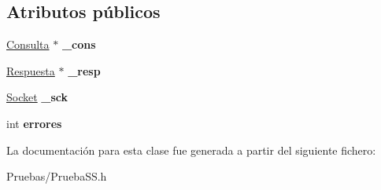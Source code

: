 \subsection*{\-Atributos públicos}
\begin{DoxyCompactItemize}
\item 
\hypertarget{classssEmisor_a0588e71dc02490593286eb5e2bfd414d}{\hyperlink{classConsulta}{\-Consulta} $\ast$ {\bfseries \-\_\-cons}}\label{classssEmisor_a0588e71dc02490593286eb5e2bfd414d}

\item 
\hypertarget{classssEmisor_abea16c87ff90df54136e8c45157f2194}{\hyperlink{classRespuesta}{\-Respuesta} $\ast$ {\bfseries \-\_\-resp}}\label{classssEmisor_abea16c87ff90df54136e8c45157f2194}

\item 
\hypertarget{classssEmisor_aeb3c41f96917e474ba6b655131f1ccf8}{\hyperlink{classSocket}{\-Socket} {\bfseries \-\_\-sck}}\label{classssEmisor_aeb3c41f96917e474ba6b655131f1ccf8}

\item 
\hypertarget{classssEmisor_a6f4bf514975f95fa450bee1ad2903c64}{int {\bfseries errores}}\label{classssEmisor_a6f4bf514975f95fa450bee1ad2903c64}

\end{DoxyCompactItemize}


\-La documentación para esta clase fue generada a partir del siguiente fichero\-:\begin{DoxyCompactItemize}
\item 
\-Pruebas/\-Prueba\-S\-S.\-h\end{DoxyCompactItemize}
